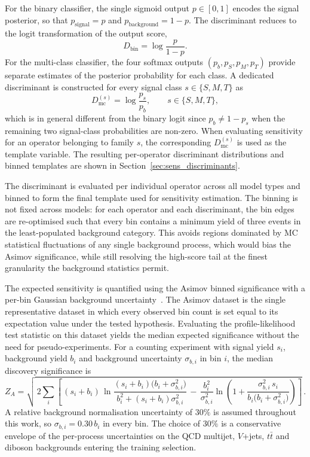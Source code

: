 For the binary classifier, the single sigmoid output $p \in [0,1]$ encodes the signal posterior, so that $p_{\mathrm{signal}} = p$ and $p_{\mathrm{background}} = 1-p$. The discriminant reduces to the logit transformation of the output score,
\begin{equation}
D_{\mathrm{bin}} = \log\frac{p}{1-p}.
\end{equation}
For the multi-class classifier, the four softmax outputs $(p_b,p_S,p_M,p_T)$ provide separate estimates of the posterior probability for each class. A dedicated discriminant is constructed for every signal class $s \in \{S,M,T\}$ as
\begin{equation}
D_{\mathrm{mc}}^{(s)} = \log\frac{p_s}{p_b}, \qquad s \in \{S,M,T\},
\end{equation}
which is in general different from the binary logit since $p_b \neq 1 - p_s$ when the remaining two signal-class probabilities are non-zero. When evaluating sensitivity for an operator belonging to family $s$, the corresponding $D_{\mathrm{mc}}^{(s)}$ is used as the template variable. The resulting per-operator discriminant distributions and binned templates are shown in Section~\ref{sec:sens_discriminants}.

The discriminant is evaluated per individual operator across all model types and binned to form the final template used for sensitivity estimation. The binning is not fixed across models: for each operator and each discriminant, the bin edges are re-optimised such that every bin contains a minimum yield of three events in the least-populated background category. This avoids regions dominated by MC statistical fluctuations of any single background process, which would bias the Asimov significance, while still resolving the high-score tail at the finest granularity the background statistics permit.

The expected sensitivity is quantified using the Asimov binned significance with a per-bin Gaussian background uncertainty~\cite{Cowan:2010js}. The Asimov dataset is the single representative dataset in which every observed bin count is set equal to its expectation value under the tested hypothesis. Evaluating the profile-likelihood test statistic on this dataset yields the median expected significance without the need for pseudo-experiments. For a counting experiment with signal yield $s_i$, background yield $b_i$ and background uncertainty $\sigma_{b,i}$ in bin $i$, the median discovery significance is
\begin{equation}
Z_A = \sqrt{\,2\sum_i\left[\,(s_i+b_i)\,\ln\!\frac{(s_i+b_i)\bigl(b_i+\sigma_{b,i}^{2}\bigr)}{b_i^{2}+(s_i+b_i)\sigma_{b,i}^{2}} \,-\,\frac{b_i^{2}}{\sigma_{b,i}^{2}}\ln\!\left(1+\frac{\sigma_{b,i}^{2}\,s_i}{b_i\bigl(b_i+\sigma_{b,i}^{2}\bigr)}\right)\right]}\,.
\label{eq:zasymptotic}
\end{equation}
A relative background normalisation uncertainty of $30\%$ is assumed throughout this work, so $\sigma_{b,i}=0.30\,b_i$ in every bin. The choice of $30\%$ is a conservative envelope of the per-process uncertainties on the QCD multijet, $V$+jets, $t\bar{t}$ and diboson backgrounds entering the training selection.

